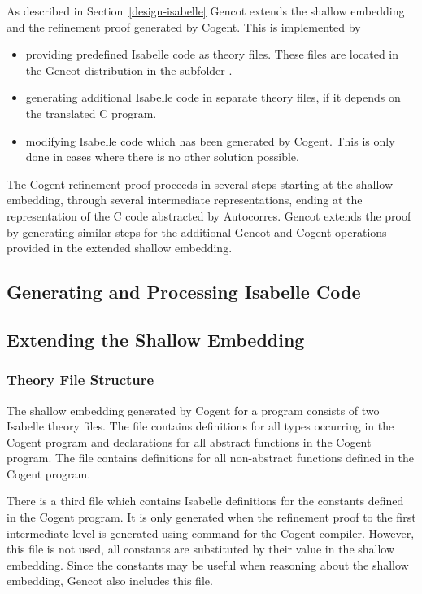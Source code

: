As described in Section~\ref{design-isabelle} Gencot extends the shallow embedding and 
the refinement proof generated by Cogent. This is implemented by
\begin{itemize}
\item providing predefined Isabelle code as theory files. These files are located 
in the Gencot distribution in the subfolder .
\item generating additional Isabelle code in separate theory files, if it depends 
on the translated C program.
\item modifying Isabelle code which has been generated by Cogent. This is only done
in cases where there is no other solution possible.
\end{itemize}

The Cogent refinement proof proceeds in several steps starting at the shallow embedding, through several intermediate
representations, ending at the representation of the C code abstracted by Autocorres. Gencot extends the proof by
generating similar steps for the additional Gencot and Cogent operations provided in the extended shallow embedding.

\subsection{Generating and Processing Isabelle Code}
\label{impl-isabelle-code}

\subsection{Extending the Shallow Embedding}
\label{impl-isabelle-shallow}

\subsubsection{Theory File Structure}

The shallow embedding generated by Cogent for a program  consists of two Isabelle theory files. The file 
 contains definitions for all types occurring in the Cogent program and declarations
for all abstract functions in the Cogent program. The file  contains definitions 
for all non-abstract functions defined in the Cogent program.

There is a third file  which contains Isabelle definitions for the constants 
defined in the Cogent program. It is only generated when the refinement proof to the first intermediate level is generated
using command  for the Cogent compiler. However, this file is not used, all constants are 
substituted by their value in the shallow embedding. Since the constants may be useful when reasoning about the shallow
embedding, Gencot also includes this file.

